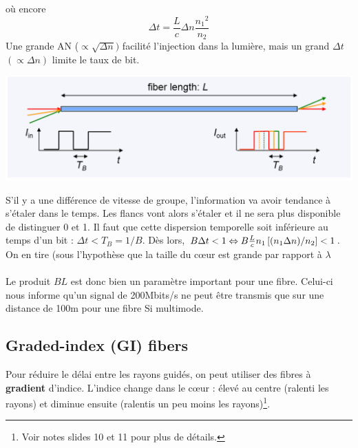 où encore
\begin{equation}
\Delta t = \frac{L}{c}\Delta n\frac{{{n_1}^2}}{{{n_2}}}
\end{equation}
Une grande AN ($\propto \sqrt{\Delta n})$ facilité l'injection dans la lumière, mais un grand $\Delta t$ $(\propto\Delta n)$ limite le taux de bit.

\begin{center}
	\includegraphics[scale=0.4]{ch1/image6.png}
\end{center}

S'il y a une différence de vitesse de groupe, l'information va avoir tendance à s'étaler dans le 
temps. Les flancs vont alors s'étaler et il ne sera plus disponible de distinguer 0 et 1. Il faut que
cette dispersion temporelle soit inférieure au temps d'un bit : $\Delta t < T_B = 1/B$. Dès lors, 
$B\Delta t < 1 \Leftrightarrow B\frac{L}{c}{n_1}\left[ {{{\left( {{n_1}\Delta n} \right)} \mathord{\left/
 {\vphantom {{\left( {{n_1}\Delta n} \right)} {{n_2}}}} \right.
 \kern-\nulldelimiterspace} {{n_2}}}} \right] < 1$. On en tire (sous l'hypothèse que la taille du 
 cœur est grande par rapport à $\lambda$\\
 
 \ \\
 
Le produit $BL$ est donc bien un paramètre important pour une fibre. Celui-ci nous informe qu'un
signal de 200Mbits/s ne peut être transmis que sur une distance de 100m pour une fibre Si multimode. 

\newpage
\subsection{Graded-index (GI) fibers}
Pour réduire le délai entre les rayons guidés, on peut utiliser des fibres à \textbf{gradient} 
d'indice. L'indice change dans le cœur : élevé au centre (ralenti les rayons) et diminue ensuite 
(ralentis un peu moins les rayons)\footnote{Voir notes slides 10 et 11 pour plus de détails.}. 


